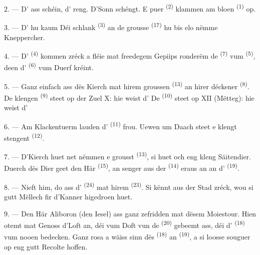 2. --- D' ass schéin, d' reng. D'Sonn schéngt. E puer
 \textsuperscript{(2)} klammen am bloen 
\textsuperscript{(1)} op.

3. --- D' hu kaum  Déi schlank 
\textsuperscript{(3)} an de grousse  \textsuperscript{(17)} hu bis elo
nëmme Kneppercher.

4. --- D' \textsuperscript{(4)} kommen zréck a fléie mat freedegem
Gepiips ronderëm de  \textsuperscript{(7)} vum 
\textsuperscript{(5)}, deen d' \textsuperscript{(6)} vum Duerf kréint.

\VUsaut{3.4mm}
\VUsaut{3.0mm}

5. --- Ganz einfach ass dës Kierch mat hirem groussen 
\textsuperscript{(13)} an hirer déckener  \textsuperscript{(8)}. De
klengen  \textsuperscript{(9)} steet op der Zuel X: hie weist
d' De  \textsuperscript{(10)} steet op XII
(Mëtteg): hie weist d'

6. --- Am Klackentuerm lauden d' \textsuperscript{(11)} frou. Uewen
um Daach steet e klengt stengent  \textsuperscript{(12)}.

7. --- D'Kierch huet net nëmmen e grousst  \textsuperscript{(13)}, si
huet och eng kleng Säitendier. Duerch dës Dier geet den Här 
\textsuperscript{(15)}, an senger  aus der 
\textsuperscript{(14)} eraus an an d'
\textsuperscript{(19)}.

8. --- Nieft him, do ass d' \textsuperscript{(24)} mat hirem
 \textsuperscript{(23)}. Si kënnt aus der Stad zréck, wou si gutt
Mëllech fir d'Kanner higedroen huet.

\VUsaut{4.0mm}
\VUsaut{3.4mm}

9. --- Den Här Aliboron (den Iesel) ass ganz zefridden mat dësem Moiestour. Hien
otemt mat Genoss d'Loft an, déi vum Doft vun de  \textsuperscript{(20)}
gebeemt ass, déi d' \textsuperscript{(18)} vum nooen
 bedecken. Ganz rosa a wäiss sinn dës 
\textsuperscript{(18)} an  \textsuperscript{(19)}, a si loosse
souguer op eng gutt Recolte hoffen.

